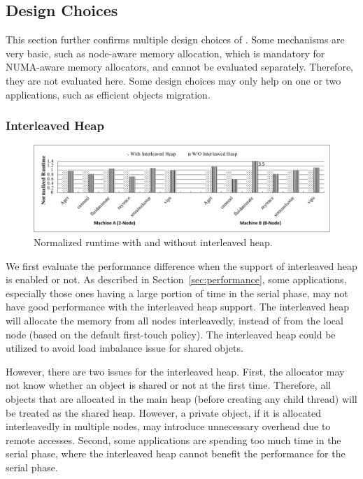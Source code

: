 \subsection{Design Choices}
\label{sec:design}

This section further confirms multiple design choices of \NM{}. Some mechanisms are very basic, such as node-aware memory allocation, which is mandatory for NUMA-aware memory allocators, and cannot be evaluated separately. Therefore, they are not evaluated here. Some design choices may only help on one or two applications, such as efficient objects migration. 

\subsubsection{Interleaved Heap} 
\label{sec:interleavedheap}

\begin{figure}[H]
    \centering
    \includegraphics[width=\textwidth]{figure/interleavedheap.pdf}
    \caption{Normalized runtime with and without interleaved heap.\label{fig:interleavedheap}}  
\end{figure}

We first evaluate the performance difference when the support of interleaved heap is enabled or not. As described in Section~\ref{sec:performance}, some applications, especially those ones having a large portion of time in the serial phase, may not have good performance with the interleaved heap support. The interleaved heap will allocate the memory from all nodes interleavedly, instead of from the local node (based on the default first-touch policy). The interleaved heap could be utilized to avoid load imbalance issue for shared objets. 

However, there are two issues for the interleaved heap. First, the allocator may not know whether an object is shared or not at the first time. Therefore, all objects that are allocated in the main heap (before creating any child thread) will be treated as the shared heap. However, a private object, if it is allocated interleavedly in multiple nodes, may introduce unnecessary overhead due to remote accesses. Second, some applications are spending too much time in the serial phase, where the interleaved heap cannot benefit the performance for the serial phase. 

